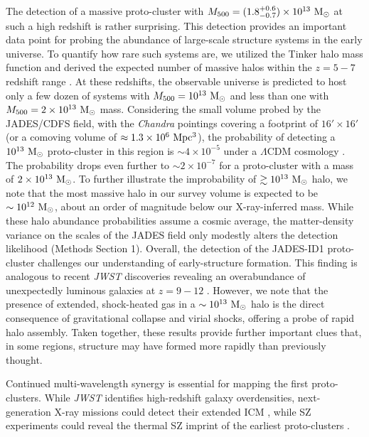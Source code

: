 \documentclass[pdflatex,sn-mathphys-num]{sn-jnl}
\theoremstyle{thmstyleone}
\theoremstyle{thmstyletwo}
\theoremstyle{thmstylethree}
\begin{document}
The detection of a massive proto-cluster with $M_{500}= (1.8^{+0.6}_{-0.7}) \times 10^{13} \ \rm{M_{\odot}}$ at such a high redshift is rather surprising. This detection provides an important data point for probing the abundance of large-scale structure systems in the early universe. To quantify how rare such systems are, we utilized the Tinker halo mass function and derived the expected number of massive halos within the $z=5-7$ redshift range \cite{2008ApJ...688..709T}. At these redshifts, the observable universe is predicted to host only a few dozen of systems with $M_{500} = 10^{13} \ \rm{M_{\odot}}$ and less than one with $M_{500} = 2\times10^{13} \ \rm{M_{\odot}}$ mass. Considering the small volume probed by the JADES/CDFS field, with the \textit{Chandra} pointings covering a footprint of $16'\times16'$ (or a comoving volume of $\approx1.3\times 10^6 \ \rm{Mpc^3}$), the probability of detecting a $10^{13} \ \rm{M_{\odot}}$ proto-cluster in this region is $\sim4\times10^{-5}$ under a $\Lambda$CDM cosmology \cite{2020A&A...641A...6P}. The probability drops even further to $\sim 2\times10^{-7}$ for a proto-cluster with a mass of $2\times10^{13} \ \rm{M_{\odot}}$. To further illustrate the improbability of $ \gtrsim 10^{13} \ \rm{M_{\odot}}$ halo, we note that the most massive halo in our survey volume is expected to be $\sim10^{12}\ \rm{M_{\odot}}$, about an order of magnitude below our X-ray-inferred mass. While these halo abundance probabilities assume a cosmic average, the matter-density variance on the scales of the JADES field only modestly alters the detection likelihood (Methods Section 1). Overall, the detection of the JADES-ID1 proto-cluster challenges our understanding of early-structure formation. This finding is analogous to recent \textit{JWST} discoveries revealing an overabundance of unexpectedly luminous galaxies at $z=9-12$ \cite{2023Natur.616..266L,2023NatAs...7..731B,2024MNRAS.531.2615C,2024arXiv240714973C,2025MNRAS.536.1018L}. However, we note that the presence of extended, shock-heated gas in a $\sim10^{13} \ \rm{M_{\odot}}$ halo is the direct consequence of gravitational collapse and virial shocks, offering a probe of rapid halo assembly. Taken together, these results provide further important clues that, in some regions, structure may have formed more rapidly than previously thought.

Continued multi-wavelength synergy is essential for mapping the first proto-clusters. While \textit{JWST} identifies high-redshift galaxy overdensities, next-generation X-ray missions could detect their extended ICM \cite{2019JATIS...5b1001G,2022arXiv221109827K,2025NatAs...9...36C}, while SZ experiments could reveal the thermal SZ imprint of the earliest proto-clusters \cite{2019BAAS...51g...6S,2023pcsf.conf..304C,2025A&A...694A.142M}.
\end{document}
